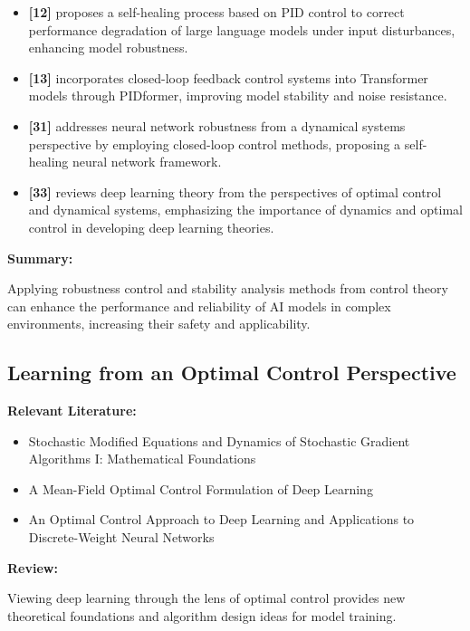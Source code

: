 \documentclass{article}
\theoremstyle{plain}
\theoremstyle{definition}
\theoremstyle{remark}
\begin{document}
\begin{itemize}
    \item \textbf{[12]} proposes a self-healing process based on PID control to correct performance degradation of large language models under input disturbances, enhancing model robustness.
    
    \item \textbf{[13]} incorporates closed-loop feedback control systems into Transformer models through PIDformer, improving model stability and noise resistance.
    
    \item \textbf{[31]} addresses neural network robustness from a dynamical systems perspective by employing closed-loop control methods, proposing a self-healing neural network framework.
    
    \item \textbf{[33]} reviews deep learning theory from the perspectives of optimal control and dynamical systems, emphasizing the importance of dynamics and optimal control in developing deep learning theories.
\end{itemize}

\textbf{Summary:}

Applying robustness control and stability analysis methods from control theory can enhance the performance and reliability of AI models in complex environments, increasing their safety and applicability.

\subsection{Learning from an Optimal Control Perspective}
\textbf{Relevant Literature:}
\begin{itemize}
    \item Stochastic Modified Equations and Dynamics of Stochastic Gradient Algorithms I: Mathematical Foundations
    \item A Mean-Field Optimal Control Formulation of Deep Learning
    \item An Optimal Control Approach to Deep Learning and Applications to Discrete-Weight Neural Networks
\end{itemize}

\textbf{Review:}

Viewing deep learning through the lens of optimal control provides new theoretical foundations and algorithm design ideas for model training.
\end{document}

